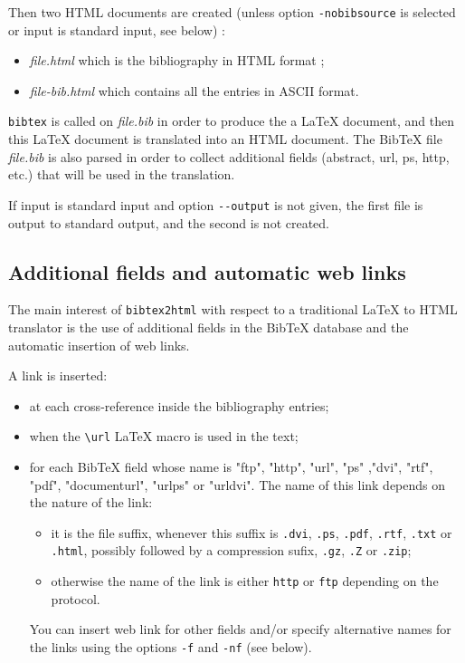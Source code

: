 \documentclass[11pt,a4paper]{article}
\newcommand{\link}[2]{#2}
\begin{document}
Then two HTML documents are created (unless option
\verb|-nobibsource| is selected or input is standard input, see below) : 
\begin{itemize}
\item \textit{file.html} which is the bibliography in HTML format
;
\item \textit{file-bib.html} which contains all the entries in ASCII
  format.
\end{itemize}
\texttt{bibtex} is called on \textit{file.bib} in order to produce the
a LaTeX document, and then this LaTeX document is translated into an
HTML document.  The BibTeX file \textit{file.bib} is also parsed in
order to collect additional fields (abstract, url, ps, http, etc.)
that will be used in the translation.

If input is standard input and option \verb|--output| is not given,
the first file is output to standard output, and the second is not
created.


\subsection{Additional fields and automatic web links}

The main interest of \texttt{bibtex2html} with respect to a
traditional LaTeX to HTML translator is the use of additional fields
in the BibTeX database and the automatic insertion of web
links.

A link is inserted:
\begin{itemize}

\item  at each cross-reference inside the bibliography entries; 

\item  when the \verb|\url| LaTeX macro is used in the text; 

\item  for each BibTeX field whose name is "ftp", "http", "url", "ps"
  ,"dvi", "rtf", "pdf",
  "documenturl", "urlps" or "urldvi". The name of this link depends on
  the nature of the link: 
  \begin{itemize}
  \item it is the file suffix, whenever this suffix is \texttt{.dvi},
    \texttt{.ps}, \texttt{.pdf}, \texttt{.rtf}, \texttt{.txt} or
    \texttt{.html}, possibly followed by a compression sufix,
    \texttt{.gz}, \texttt{.Z} or \texttt{.zip};
  \item otherwise the name of the link is either \texttt{http} or
    \texttt{ftp} depending on the protocol.
  \end{itemize}
  
  You can insert web link for other fields and/or specify alternative
  names for the links using the options
  \texttt{-f} and \texttt{-nf} (see below).
  
\end{itemize}
\end{document}
